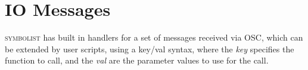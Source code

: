 \documentclass{article}
\def\symbolist{\textsc{symbolist}\xspace}
\def\oscfontsize{\footnotesize}
\begin{document}
%
%
%
%
%
%
%            
%
%
%
%        
%    
%
%
%
%
%
%
%
%
%    
%
%


\section{IO Messages}\label{subsec:io_messages}

\symbolist has built in handlers for a set of messages received via OSC, which can be extended by user scripts, using a key/val syntax, where the \textit{key} specifies the function to call, and the \textit{val} are the parameter values to use for the call.
\end{document}
